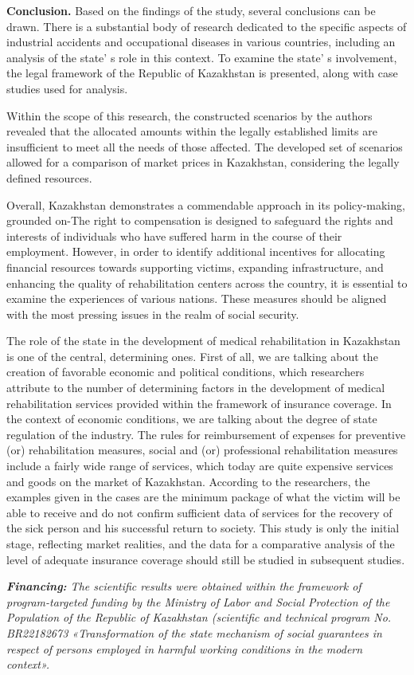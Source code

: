 \begin{multicols}{2}
{\bfseries Conclusion.} Based on the findings of the study, several
conclusions can be drawn. There is a substantial body of research
dedicated to the specific aspects of industrial accidents and
occupational diseases in various countries, including an analysis of the
state' s role in this context. To examine the
state' s involvement, the legal framework of the Republic
of Kazakhstan is presented, along with case studies used for analysis.

Within the scope of this research, the constructed scenarios by the
authors revealed that the allocated amounts within the legally
established limits are insufficient to meet all the needs of those
affected. The developed set of scenarios allowed for a comparison of
market prices in Kazakhstan, considering the legally defined resources.

Overall, Kazakhstan demonstrates a commendable approach in its
policy-making, grounded on-The right to compensation is designed to
safeguard the rights and interests of individuals who have suffered harm
in the course of their employment. However, in order to identify
additional incentives for allocating financial resources towards
supporting victims, expanding infrastructure, and enhancing the quality
of rehabilitation centers across the country, it is essential to examine
the experiences of various nations. These measures should be aligned
with the most pressing issues in the realm of social security.

The role of the state in the development of medical rehabilitation in
Kazakhstan is one of the central, determining ones. First of all, we are
talking about the creation of favorable economic and political
conditions, which researchers attribute to the number of determining
factors in the development of medical rehabilitation services provided
within the framework of insurance coverage. In the context of economic
conditions, we are talking about the degree of state regulation of the
industry. The rules for reimbursement of expenses for preventive (or)
rehabilitation measures, social and (or) professional rehabilitation
measures include a fairly wide range of services, which today are quite
expensive services and goods on the market of Kazakhstan. According to
the researchers, the examples given in the cases are the minimum package
of what the victim will be able to receive and do not confirm sufficient
data of services for the recovery of the sick person and his successful
return to society. This study is only the initial stage, reflecting
market realities, and the data for a comparative analysis of the level
of adequate insurance coverage should still be studied in subsequent
studies.

\emph{{\bfseries Financing:} The scientific results were obtained within
the framework of program-targeted funding by the Ministry of Labor and
Social Protection of the Population of the Republic of Kazakhstan
(scientific and technical program No. BR22182673 «Transformation of the
state mechanism of social guarantees in respect of persons employed in
harmful working conditions in the modern context».}
\end{multicols}

